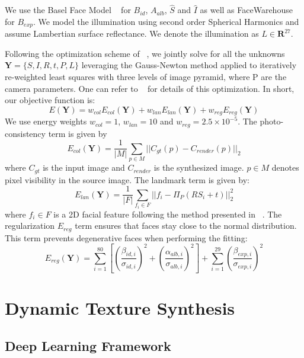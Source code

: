 We use the Basel Face Model ~\cite{blanz1999} for $B_{id}$, $A_{alb}$, $\hat{S}$ and $\hat{I}$ as well as FaceWarehouse ~\cite{cao2014facewarehouse} for $B_{exp}$. We model the illumination using second order Spherical Harmonics and assume Lambertian surface reflectance.  We denote the illumination as $L \in \mathbf{R}^{27}$.  

Following the optimization scheme of ~\cite{f2f}, we jointly solve for all the unknowns $\textbf{Y} = \{ S, I, R, t, P, L \}$ leveraging the Gauss-Newton method applied to iteratively re-weighted least squares with three levels of image pyramid, where P are the camera parameters. One can refer to ~\cite{f2f} for details of this optimization.  In short, our objective function is:
\begin{equation}
E(\textbf{Y}) = w_{col} E_{col}(\textbf{Y}) + w_{lan} E_{lan}(\textbf{Y}) + w_{reg}E_{reg}(\textbf{Y})
\end{equation}
We use energy weights $w_{col} = 1$, $w_{lan} = 10$ and $w_{reg} = 2.5 \times 10^{-5}$.  
The photo-consistency term is given by 
\begin{equation}
E_{col}(\textbf{Y}) = \frac{1}{| M | } \sum_{p \in M}  ||C_{gt}(p) - C_{render}(p)||_2
\end{equation}
 where $C_{gt}$ is the input image and $C_{render}$ is the synthesized image.  $p \in M$ denotes pixel visibility in the source image.  
The landmark term is given by: 
\begin{equation}
E_{lan}(\textbf{Y}) = \frac{1}{|F|} \sum_{f_i \in F}  || f_i - \Pi_P(RS_i + t) ||_2^2
\end{equation}
 where $f_i \in F$ is a 2D facial feature following the method presented in ~\cite{kazemi2014one}.  
The regularization $E_{reg}$ term ensures that faces stay close to the normal distribution.  This term prevents degenerative faces when performing the fitting:
\begin{equation}
E_{reg}(\textbf{Y}) = \sum_{i = 1}^{80} [ (\frac{\beta_{id, i}}{\sigma_{id,i}})^2 + (\frac{\alpha_{alb, i}}{\sigma_{alb, i}})^2] + \sum_{i =1}^{29} ( \frac{\beta_{exp,i}}{\sigma_{exp,i}})^2
\end{equation}

\section{ Dynamic Texture Synthesis}

\subsection{Deep Learning Framework}

